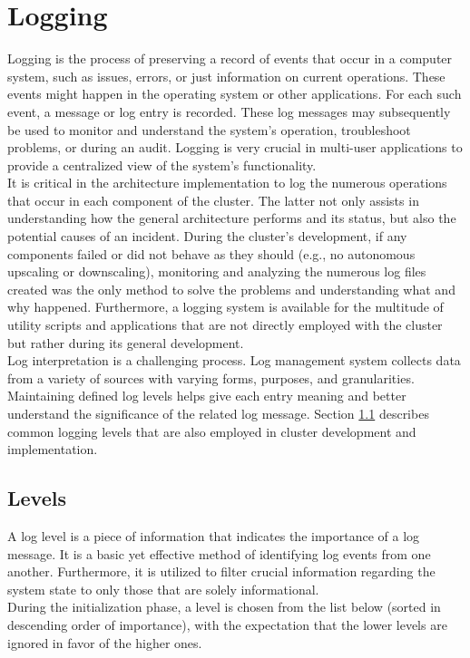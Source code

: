 \chapter{Logging}
\label{cha:logging}

Logging is the process of preserving a record of events that occur in a computer
system, such as issues, errors, or just information on current operations. These
events might happen in the operating system or other applications. For each such
event, a message or log entry is recorded. These log messages may subsequently
be used to monitor and understand the system's operation, troubleshoot problems,
or during an audit. Logging is very crucial in multi-user applications to provide
a centralized view of the system's functionality\cite{logging}. \\ %
It is critical in the architecture implementation to log the numerous operations
that occur in each component of the cluster. The latter not only assists in understanding
how the general architecture performs and its status, but also the potential
causes of an incident. During the cluster's development, if any components
failed or did not behave as they should (e.g., no autonomous upscaling or downscaling),
monitoring and analyzing the numerous log files created was the only method to solve
the problems and understanding what and why happened. Furthermore, a logging system
is available for the multitude of utility scripts and applications that are not directly
employed with the cluster but rather during its general development. \\ %
Log interpretation is a challenging process. Log management system collects data
from a variety of sources with varying forms, purposes, and granularities. Maintaining
defined log levels helps give each entry meaning and better understand the significance
of the related log message\cite{logging_levels}. Section \ref{sec:logging_levels}
describes common logging levels that are also employed in cluster development and
implementation.

\section{Levels}
\label{sec:logging_levels}

A log level is a piece of information that indicates the importance of a log
message. It is a basic yet effective method of identifying log events from one another.
Furthermore, it is utilized to filter crucial information regarding the system state
to only those that are solely informational\cite{logging_levels}. \\ %
During the initialization phase, a level is chosen from the list below (sorted
in descending order of importance), with the expectation that the lower levels
are ignored in favor of the higher ones.

